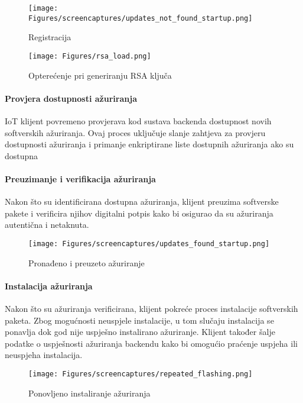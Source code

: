 \documentclass[zavrsnirad]{fer}
\begin{document}
	
	\begin{figure}[H]
		\centering
		\texttt{[image: Figures/screencaptures/updates\_not\_found\_startup.png]} 
		\caption{Registracija}
		\label{slk:device_registration}
	\end{figure}
	
	
	\begin{figure}[H]
		\centering
		\texttt{[image: Figures/rsa\_load.png]} 
		\caption{Opterećenje pri generiranju RSA ključa}
		\label{slk:rsa_load}
	\end{figure}
	
	
	\paragraph{Provjera dostupnosti ažuriranja} IoT klijent povremeno provjerava kod sustava backenda dostupnost novih softverskih ažuriranja. Ovaj proces uključuje slanje zahtjeva za provjeru dostupnosti ažuriranja i primanje enkriptirane liste dostupnih ažuriranja ako su dostupna
	
	\paragraph{Preuzimanje i verifikacija ažuriranja} Nakon što su identificirana dostupna ažuriranja, klijent preuzima softverske pakete i verificira njihov digitalni potpis kako bi osigurao da su ažuriranja autentična i netaknuta.
	
	\begin{figure}[H]
		\centering
		\texttt{[image: Figures/screencaptures/updates\_found\_startup.png]} 
		\caption{Pronađeno i preuzeto ažuriranje}
		\label{slk:device_updates_found}
	\end{figure}
	
	\paragraph{Instalacija ažuriranja}	Nakon što su ažuriranja verificirana, klijent pokreće proces instalacije softverskih paketa. Zbog mogućnosti neuspjele instalacije, u tom slučaju instalacija se ponavlja dok god nije uspješno instalirano ažuriranje. Klijent također šalje podatke o uspješnosti ažuriranja backendu kako bi omogućio praćenje uspjeha ili neuspjeha instalacija.
	
	\begin{figure}[H]
		\centering
		\texttt{[image: Figures/screencaptures/repeated\_flashing.png]} 
		\caption{Ponovljeno instaliranje ažuriranja}
		\label{slk:device_registered_startup}
	\end{figure}
	
\end{document}
